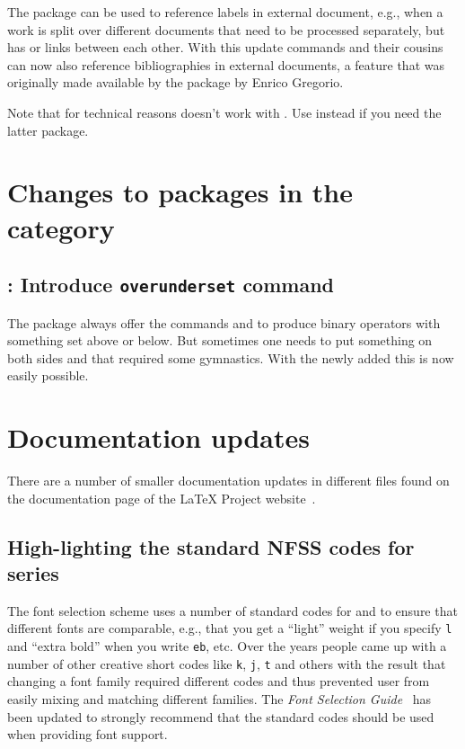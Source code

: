 \documentclass{ltnews}
\begin{document}
The  package can be used to reference labels in external
document, e.g., when a work is split over different documents that
need to be processed separately, but has  or 
links between each other. With this update  commands and
their cousins can now also reference bibliographies in external
documents, a feature that was originally made available by the package
 by Enrico Gregorio.

Note that for technical reasons  doesn't work with
. Use  instead if you need the latter
package.


\section{Changes to packages in the  category}

\subsection{: Introduce \texttt{overunderset} command}

The  package always offer the commands  and
 to produce binary operators with something set above or
below. But sometimes one needs to put something on both sides and that
required some gymnastics. With the newly added  this
is now easily possible.



\section{Documentation updates}

There are a number of smaller documentation updates in different files
found on the documentation page of the \LaTeX{} Project
website~\cite{30:site-doc}.

\subsection{High-lighting the standard NFSS codes for series}

The font selection scheme uses a number of standard codes for
 and  to ensure that different fonts are
comparable, e.g., that you get a \enquote{light} weight if you specify
\texttt{l} and \enquote{extra bold} when you write \texttt{eb},
etc. Over the years people came up with a number of other creative
short codes like \texttt{k}, \texttt{j}, \texttt{t} and others with
the result that changing a font family required different codes and
thus prevented user from easily mixing and matching different
families. The \emph{Font Selection Guide}~\cite{fntguide} has been
updated to strongly recommend that the standard codes should be used
when providing font support.
\end{document}
